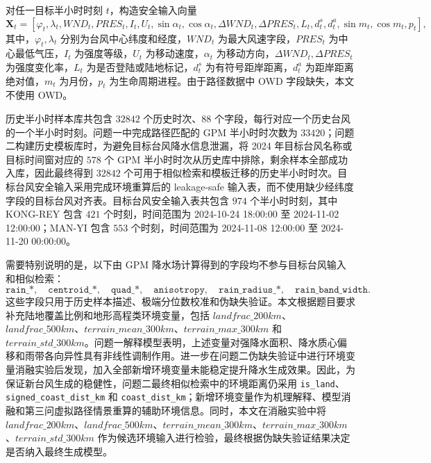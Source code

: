 \documentclass[UTF8,a4paper,zihao=5,fontset=fandol]{ctexart}
\numberwithin{equation}{section}
\numberwithin{figure}{section}
\numberwithin{table}{section}
\begin{document}
对任一目标半小时时刻 $t$，构造安全输入向量
\begin{equation}
\boldsymbol{X}_t=
\left[
\varphi_t,\lambda_t,WND_t,PRES_t,I_t,U_t,
\sin \alpha_t,\cos \alpha_t,
\Delta WND_t,\Delta PRES_t,
L_t,d_t^s,d_t^a,
\sin m_t,\cos m_t,p_t
\right],
\end{equation}
其中，$\varphi_t,\lambda_t$ 分别为台风中心纬度和经度，$WND_t$ 为最大风速字段，$PRES_t$ 为中心最低气压，$I_t$ 为强度等级，$U_t$ 为移动速度，$\alpha_t$ 为移动方向，$\Delta WND_t,\Delta PRES_t$ 为强度变化率，$L_t$ 为是否登陆或陆地标记，$d_t^s$ 为有符号距岸距离，$d_t^a$ 为距岸距离绝对值，$m_t$ 为月份，$p_t$ 为生命周期进程。由于路径数据中 OWD 字段缺失，本文不使用 OWD。

历史半小时样本库共包含 $32842$ 个历史时次、$88$ 个字段，每行对应一个历史台风的一个半小时时刻。问题一中完成路径匹配的 GPM 半小时时次数为 $33420$；问题二构建历史模板库时，为避免目标台风降水信息泄漏，将 2024 年目标台风名称或目标时间窗对应的 $578$ 个 GPM 半小时时次从历史库中排除，剩余样本全部成功入库，因此最终得到 $32842$ 个可用于相似检索和模板迁移的历史半小时时次。目标台风安全输入采用完成环境重算后的 leakage-safe 输入表，而不使用缺少经纬度字段的目标台风对齐表。目标台风安全输入表共包含 $974$ 个半小时时刻，其中 KONG-REY 包含 $421$ 个时刻，时间范围为 2024-10-24 18:00:00 至 2024-11-02 12:00:00；MAN-YI 包含 $553$ 个时刻，时间范围为 2024-11-08 12:00:00 至 2024-11-20 00:00:00。

需要特别说明的是，以下由 GPM 降水场计算得到的字段均不参与目标台风输入和相似检索：
\begin{equation}
\texttt{rain\_*},\quad
\texttt{centroid\_*},\quad
\texttt{quad\_*},\quad
\texttt{anisotropy},\quad
\texttt{rain\_radius\_*},\quad
\texttt{rain\_band\_width}.
\end{equation}
这些字段只用于历史样本描述、极端分位数校准和伪缺失验证。本文根据题目要求补充陆地覆盖比例和地形高程类环境变量，包括 $landfrac\_200km$、$landfrac\_500km$、$terrain\_mean\_300km$、$terrain\_max\_300km$ 和 $terrain\_std\_300km$。问题一解释模型表明，上述变量对强降水面积、降水质心偏移和雨带各向异性具有非线性调制作用。进一步在问题二伪缺失验证中进行环境变量消融实验后发现，加入全部新增环境变量未能稳定提升降水生成效果。因此，为保证新台风生成的稳健性，问题二最终相似检索中的环境距离仍采用 \texttt{is\_land}、\texttt{signed\_coast\_dist\_km} 和 \texttt{coast\_dist\_km}；新增环境变量作为机理解释、模型消融和第三问虚拟路径情景重算的辅助环境信息。同时，本文在消融实验中将 $landfrac\_200km$、$landfrac\_500km$、$terrain\_mean\_300km$、$terrain\_max\_300km$、$terrain\_std\_300km$ 作为候选环境输入进行检验，最终根据伪缺失验证结果决定是否纳入最终生成模型。
\end{document}
